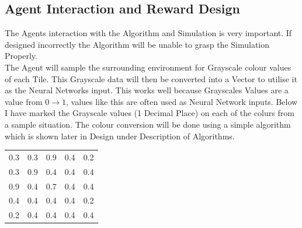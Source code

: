 \begin{flushleft}
        \subsection{Agent Interaction and Reward Design}
            The Agents interaction with the Algorithm and Simulation is very important. If designed incorrectly the Algorithm will be unable 
            to grasp the Simulation Properly. \\
            \vspace{0.2cm}
            The Agent will sample the surrounding environment for Grayscale colour values of each Tile. This Grayscale data will then be
            converted into a Vector to utilise it as the Neural Networks input. This works well because Grayscales Values are a value 
            from $0\to 1$, values like this are often used as Neural Network inputs. Below I have marked the Grayscale values (1 Decimal Place)
            on each of the colurs from a sample situation. The colour conversion will be done using a simple algorithm which is shown later
            in Design under Description of Algorithms. \\

            \begin{center}
                \begin{tabular}{ C{1cm} C{1cm} C{1cm} C{1cm} C{1cm}}
                        \rule{0pt}{1.2cm}%
                        0.3 & 0.3 & 0.9 & 0.4 & 0.2 \\
                        \rule{0pt}{1.2cm}%
                        0.3 & 0.9 & 0.4 & 0.4 & 0.4 \\
                        \rule{0pt}{1.2cm}%
                        0.9 & 0.4 & 0.7 & 0.4 & 0.4 \\
                        \rule{0pt}{1.2cm}%
                        0.4 & 0.4 & 0.4 & 0.4 & 0.2 \\
                        \rule{0pt}{1.2cm}%
                        0.2  & 0.4 & 0.4 & 0.4 & 0.4 \\
                \end{tabular}
            \end{center}


\end{flushleft}
